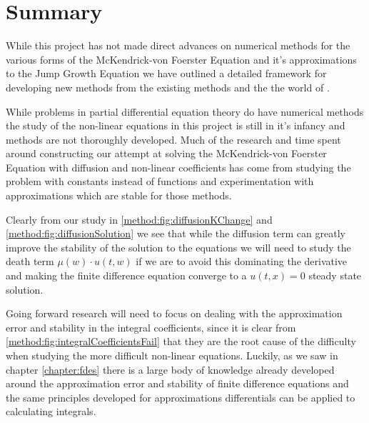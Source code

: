 \documentclass[../main.tex]{subfiles}
\begin{document}
  \section{Summary}

  While this project has not made direct advances on numerical methods for the various forms of the McKendrick-von Foerster Equation and it's approximations to the Jump Growth Equation we have outlined a detailed framework for developing new methods from the existing methods and the the world of \cite{hartvig2011}.

  While problems in partial differential equation theory do have numerical methods the study of the non-linear equations in this project is still in it's infancy and methods are not thoroughly developed. Much of the research and time spent around constructing our attempt at solving the McKendrick-von Foerster Equation with diffusion and non-linear coefficients has come from studying the problem with constants instead of functions and experimentation with approximations which are stable for those methods.

  Clearly from our study in \autoref{method:fig:diffusionKChange} and \autoref{method:fig:diffusionSolution} we see that while the diffusion term can greatly improve the stability of the solution to the equations we will need to study the death term $\mu(w) \cdot u(t, w)$ if we are to avoid this dominating the derivative and making the finite difference equation converge to a $u(t, x) = 0$ steady state solution.

  Going forward research will need to focus on dealing with the approximation error and stability in the integral coefficients, since it is clear from \autoref{method:fig:integralCoefficientsFail} that they are the root cause of the difficulty when studying the more difficult non-linear equations. Luckily, as we saw in chapter \autoref{chapter:fdes} there is a large body of knowledge already developed around the approximation error and stability of finite difference equations and the same principles developed for approximations differentials can be applied to calculating integrals.
\end{document}
